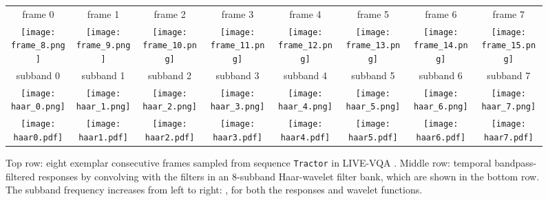 \documentclass[transmag]{IEEEtran}
\begin{document}
\begin{figure*}[!t]
\centering
\footnotesize
\def\xheight{0.068}
\def\yheihgt{0.12}
\def\rdshift{0.0562\linewidth}
\setlength{\tabcolsep}{1pt}
\begin{tabular}{cccccccc}
frame 0 &
frame 1 &
frame 2 &
frame 3 & 
frame 4 &
frame 5 &
frame 6 &
frame 7 
\\
\texttt{[image: frame\_8.png]}  & 
\texttt{[image: frame\_9.png]}  & 
\texttt{[image: frame\_10.png]} & 
\texttt{[image: frame\_11.png]} & 
\texttt{[image: frame\_12.png]} & 
\texttt{[image: frame\_13.png]} & 
\texttt{[image: frame\_14.png]} & 
\texttt{[image: frame\_15.png]}
\\
subband 0 &
subband 1 &
subband 2 &
subband 3 &
subband 4 &
subband 5 &
subband 6 & 
subband 7
\\
\texttt{[image: haar\_0.png]}  &
\texttt{[image: haar\_1.png]}  &
\texttt{[image: haar\_2.png]}  &
\texttt{[image: haar\_3.png]}  &
\texttt{[image: haar\_4.png]}  &
\texttt{[image: haar\_5.png]}  &
\texttt{[image: haar\_6.png]}  &
\texttt{[image: haar\_7.png]}
\\
\multirow{1}{*}[\rdshift]{\texttt{[image: haar0.pdf]}}  &
\texttt{[image: haar1.pdf]}  &
\texttt{[image: haar2.pdf]}  &
\texttt{[image: haar3.pdf]}  &
\texttt{[image: haar4.pdf]}  &
\texttt{[image: haar5.pdf]}  &
\texttt{[image: haar6.pdf]}  &
\texttt{[image: haar7.pdf]}
\\
\end{tabular}
\caption{Top row: eight exemplar consecutive frames sampled from sequence \texttt{Tractor} in LIVE-VQA \cite{seshadrinathan2010study}. Middle row: temporal bandpass-filtered responses by convolving with the filters in an 8-subband Haar-wavelet filter bank, which are shown in the bottom row. The subband frequency increases from left to right: , for both the responses and wavelet functions.}
\label{fig:haar}
\end{figure*}
\end{document}
